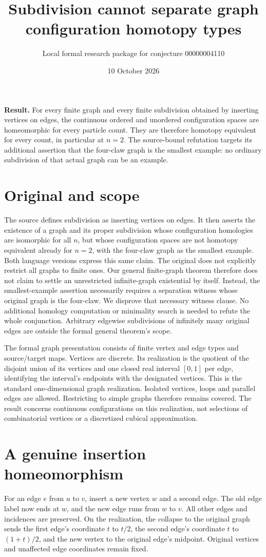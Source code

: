 \documentclass[11pt]{article}
\title{Subdivision cannot separate graph configuration homotopy types}
\author{Local formal research package for conjecture 00000004110}
\date{10 October 2026}
\begin{document}
\maketitle
\noindent\textbf{Result.} For every finite graph and every finite subdivision obtained by
inserting vertices on edges, the continuous ordered and unordered configuration
spaces are homeomorphic for every particle count. They are therefore homotopy
equivalent for every count, in particular at $n=2$. The source-bound refutation
targets its additional assertion that the four-claw graph is the smallest
example: no ordinary subdivision of that actual graph can be an example.

\section*{Original and scope}
The source defines subdivision as inserting vertices on edges. It then asserts
the existence of a graph and its proper subdivision whose configuration homologies
are isomorphic for all $n$, but whose configuration spaces are not homotopy
equivalent already for $n=2$, with the four-claw graph as the smallest example.
Both language versions express this same claim. The original does not explicitly
restrict all graphs to finite ones. Our general finite-graph theorem therefore
does not claim to settle an unrestricted infinite-graph existential by itself.
Instead, the smallest-example assertion necessarily requires a separation witness
whose original graph is the four-claw. We disprove that necessary witness clause.
No additional homology computation or minimality search is needed to refute the
whole conjunction. Arbitrary edgewise subdivisions of infinitely many original
edges are outside the formal general theorem's scope.

The formal graph presentation consists of finite vertex and edge types and
source/target maps. Vertices are discrete. Its realization is the quotient of the
disjoint union of its vertices and one closed real interval $[0,1]$ per edge,
identifying the interval's endpoints with the designated vertices. This is the
standard one-dimensional graph realization. Isolated vertices, loops and parallel
edges are allowed. Restricting to simple graphs therefore remains covered.
The result concerns continuous configurations on this realization, not selections
of combinatorial vertices or a discretized cubical approximation.

\section*{A genuine insertion homeomorphism}
For an edge $e$ from $u$ to $v$, insert a new vertex $w$ and a second edge. The
old edge label now ends at $w$, and the new edge runs from $w$ to $v$. All other
edges and incidences are preserved. On the realization, the collapse to the
original graph sends the first edge's coordinate $t$ to $t/2$, the second
edge's coordinate $t$ to $(1+t)/2$, and the new vertex to the original edge's
midpoint. Original vertices and unaffected edge coordinates remain fixed.
\end{document}
